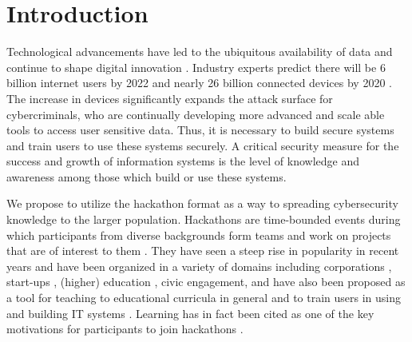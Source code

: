 \documentclass[runningheads]{llncs}
\begin{document}
\section{Introduction}
Technological advancements have led to the ubiquitous availability of data and continue to shape digital innovation \cite{davenport2013analytics}. 
Industry experts predict there will be 6 billion internet users by 2022 \cite{cybersecventures2019} and nearly 26 billion connected devices by 2020 \cite{hung2017gartner}. The increase in devices significantly expands the attack surface for cybercriminals, who are continually developing more advanced and scale able tools to access user sensitive data. %
Thus, it is necessary to build secure systems and train users to use these systems securely.
A critical security measure for the success and growth of information systems is the level of knowledge and awareness among those which build or use these systems. %

We propose to utilize the hackathon format as a way to spreading cybersecurity knowledge to the larger population. Hackathons are time-bounded events during which participants from diverse backgrounds form teams and work on projects that are of interest to them \cite{pe2018designing}. They have seen a steep rise in popularity in recent years and have been organized in a variety of domains including corporations \cite{nolte2018you,komssi2015hackathons}, start-ups \cite{nolte2019touched,cobham2017hackathon1}, (higher) education \cite{porras2019code,kienzler2017learning}, civic engagement, \cite{lodato2016issue,henderson2015getting} and have also been proposed as a tool for teaching to educational curricula in general \cite{abdullah2015stimulating,porras2019code,sakhumuzi2017student,nandi2016hackathons} and to train users in using and building IT systems \cite{weiss2015teaching,kharchenko2016university,boopathi2015learning}. Learning has in fact been cited as one of the key motivations for participants to join hackathons \cite{porras2019code,briscoe2014digital,juell2014public}.
\end{document}
